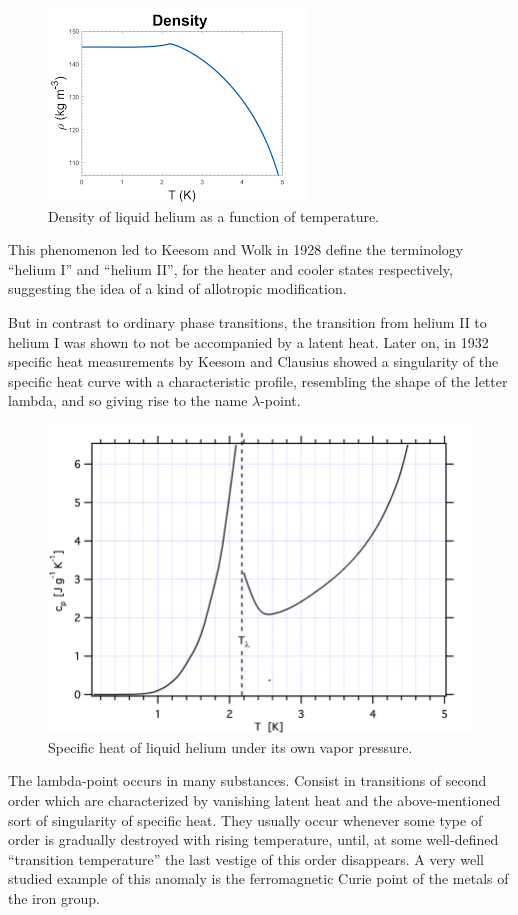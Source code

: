 \documentclass{article}
\begin{document}
\begin{figure}[H]
    \centering
    \includegraphics[width=0.62\linewidth]{Images/Density.png}
    \caption{Density of liquid helium as a function of temperature.}
    \label{fig:enter-label}
\end{figure}

This phenomenon led to Keesom and Wolk in 1928 define the terminology ``helium I'' and ``helium II'',
for the heater and cooler states respectively,
suggesting the idea of a kind of allotropic modification.

But in contrast to ordinary phase transitions, the transition from helium II to helium I was shown to not be accompanied by a latent heat. Later on, in 1932 specific heat measurements by Keesom and Clausius showed a singularity of the specific heat curve with a characteristic profile, resembling the shape of the letter lambda, and so giving rise to the name $\lambda$-point.
\\
\begin{figure}[H]
    \centering
    \includegraphics[width=0.62\linewidth]{Images/LambdaCp.png}
    \caption{Specific heat of liquid helium under its own vapor pressure.}
    \label{fig:enter-label}
\end{figure}

The lambda-point occurs in many substances. Consist in transitions of second order which are characterized by vanishing latent heat and the above-mentioned sort of singularity of specific heat. They usually occur whenever some type of order is gradually destroyed with rising temperature, until, at some well-defined ``transition temperature'' the last vestige of this order disappears. A very well studied example of this anomaly is the ferromagnetic Curie point of the metals of the iron group.
\\
\end{document}
